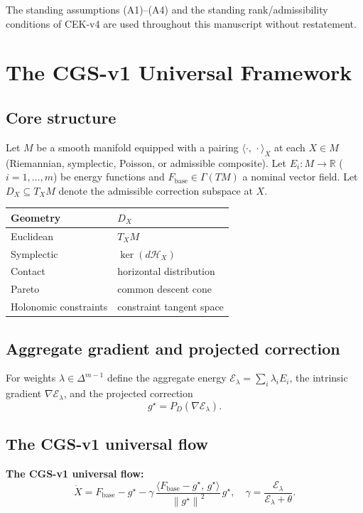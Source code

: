 \documentclass[11pt,a4paper]{article}
\theoremstyle{definition}
\newcommand{\Fbase}{F_{\mathrm{base}}}
\newcommand{\R}{\mathbb{R}}
\newcommand{\norm}[1]{\left\|#1\right\|}
\newcommand{\inner}[2]{\langle #1,\,#2\rangle}
\begin{document}
The standing assumptions (A1)--(A4) and the standing rank/admissibility conditions of CEK-v4 are used throughout this manuscript without restatement.

\section{The CGS-v1 Universal Framework}

\subsection{Core structure}

Let $M$ be a smooth manifold equipped with a pairing $\inner{\cdot}{\cdot}_X$ at each $X \in M$ (Riemannian, symplectic, Poisson, or admissible composite). Let $E_i : M \to \R$ ($i=1,\dots,m$) be energy functions and $\Fbase \in \Gamma(TM)$ a nominal vector field. Let $D_X \subseteq T_X M$ denote the admissible correction subspace at $X$.

\begin{center}
\begin{tabular}{ll}
\toprule
Geometry & $D_X$ \\
\midrule
Euclidean & $T_X M$ \\
Symplectic & $\ker(d\mathcal{H}_X)$ \\
Contact & horizontal distribution \\
Pareto & common descent cone \\
Holonomic constraints & constraint tangent space \\
\bottomrule
\end{tabular}
\end{center}

\subsection{Aggregate gradient and projected correction}

For weights $\lambda \in \Delta^{m-1}$ define the aggregate energy $\mathcal{E}_\lambda = \sum_i \lambda_i E_i$, the intrinsic gradient $\nabla \mathcal{E}_\lambda$, and the projected correction
\[
g^\star = P_{D}(\nabla \mathcal{E}_\lambda).
\]

\subsection{The CGS-v1 universal flow}

\begin{lockedbox}
\textbf{The CGS-v1 universal flow:}
\[
\dot X = \Fbase - g^\star - \gamma\,\frac{\inner{\Fbase - g^\star}{g^\star}}{\norm{g^\star}^2}\,g^\star,
\quad
\gamma = \frac{\mathcal{E}_\lambda}{\mathcal{E}_\lambda + \theta}.
\]
\end{lockedbox}
\end{document}
